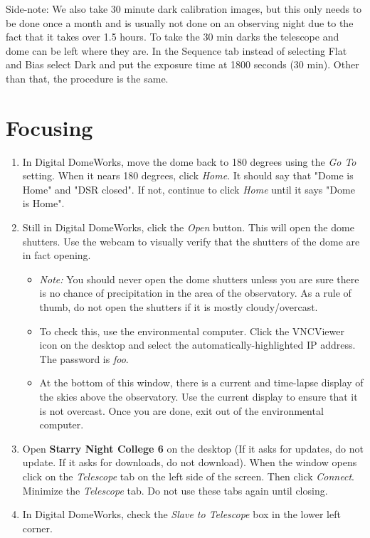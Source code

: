 \documentclass[11pt]{report}
\begin{document}
Side-note: We also take 30 minute dark calibration images, but this only needs to be done once a month and is usually not done on an observing night due to the fact that it takes over 1.5 hours. To take the 30 min darks the telescope and dome can be left where they are. In the Sequence tab instead of selecting Flat and Bias select Dark and put the exposure time at 1800 seconds (30 min). Other than that, the procedure is the same. 

\section{Focusing}

\begin{enumerate}
\item In Digital DomeWorks, move the dome back to 180 degrees using the \emph{Go To} setting. When it nears 180 degrees, click \emph{Home}. It should say that "Dome is Home" and "DSR closed". If not, continue to click \emph{Home} until it says "Dome is Home".
\item Still in Digital DomeWorks, click the \emph{Open} button. This will open the dome shutters. Use the webcam to visually verify that the shutters of the dome are in fact opening. 
\begin{itemize}
\item\emph{Note:} You should never open the dome shutters unless you are sure there is no chance of precipitation in the area of the observatory. As a rule of thumb, do not open the shutters if it is mostly cloudy/overcast.
\item To check this, use the environmental computer. Click the VNCViewer icon on the desktop and select the automatically-highlighted IP address. The password is \emph{foo}.
\item At the bottom of this window, there is a current and time-lapse display of the skies above the observatory. Use the current display to ensure that it is not overcast. Once you are done, exit out of the environmental computer.
\end{itemize}
\item Open {\bf Starry Night College 6} on the desktop (If it asks for updates, do not update. If it asks for downloads, do not download). When the window opens click on the \emph{Telescope} tab on the left side of the screen. Then click \emph{Connect}. Minimize the \emph{Telescope} tab. Do not use these tabs again until closing.
\item In Digital DomeWorks, check the \emph{Slave to Telescope} box in the lower left corner. 

\end{enumerate}
\end{document}
